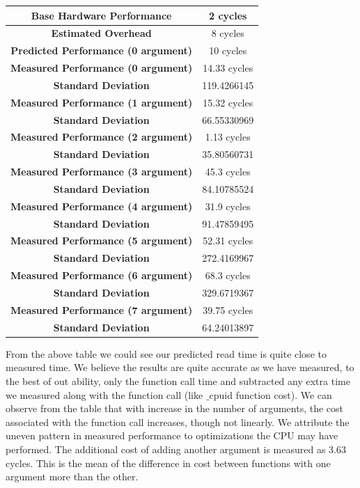 \documentclass[conference]{IEEEtran}
\begin{document}
\begin{center}
\begin{tabular}{ |c|c| } 
  \hline
  \textbf{Base Hardware Performance} & 2 cycles \\ 
  \hline
  \textbf{Estimated Overhead} &  8 cycles \\ 
  \hline
  \textbf{Predicted Performance (0 argument)} & 10 cycles \\ 
  \hline
  \textbf{Measured Performance (0 argument)} & 14.33 cycles \\ 
  \hline
  \textbf{Standard Deviation} & 119.4266145  \\ 
  \hline
  \textbf{Measured Performance (1 argument)} & 15.32 cycles \\ 
  \hline
  \textbf{Standard Deviation} & 66.55330969  \\ 
  \hline
  \textbf{Measured Performance (2 argument)} & 1.13 cycles \\ 
  \hline
  \textbf{Standard Deviation} & 35.80560731  \\ 
  \hline
  \textbf{Measured Performance (3 argument)} & 45.3 cycles \\ 
  \hline
  \textbf{Standard Deviation} & 84.10785524  \\ 
  \hline
  \textbf{Measured Performance (4 argument)} & 31.9 cycles \\ 
  \hline
  \textbf{Standard Deviation} & 91.47859495  \\ 
  \hline
  \textbf{Measured Performance (5 argument)} & 52.31 cycles \\ 
  \hline
  \textbf{Standard Deviation} & 272.4169967  \\ 
  \hline
  \textbf{Measured Performance (6 argument)} & 68.3 cycles \\ 
  \hline
  \textbf{Standard Deviation} & 329.6719367  \\ 
  \hline
  \textbf{Measured Performance (7 argument)} & 39.75 cycles \\ 
  \hline
  \textbf{Standard Deviation} & 64.24013897  \\ 
  \hline
\end{tabular}
\end{center}
       
From the above table we could see our predicted read time is quite close to measured time. 
We believe the results are quite accurate as we have measured, to the best of out ability, only the function call time and subtracted any extra time we measured along with the function call (like $\_$cpuid function cost).
We can observe from the table that with increase in the number of arguments, the cost associated with the function call increases, though not linearly. We attribute the uneven pattern in measured performance to optimizations the CPU may have performed.  
The additional cost of adding another argument is measured as 3.63 cycles. This is the mean of the difference in cost between functions with one argument more than the other.
\end{document}
